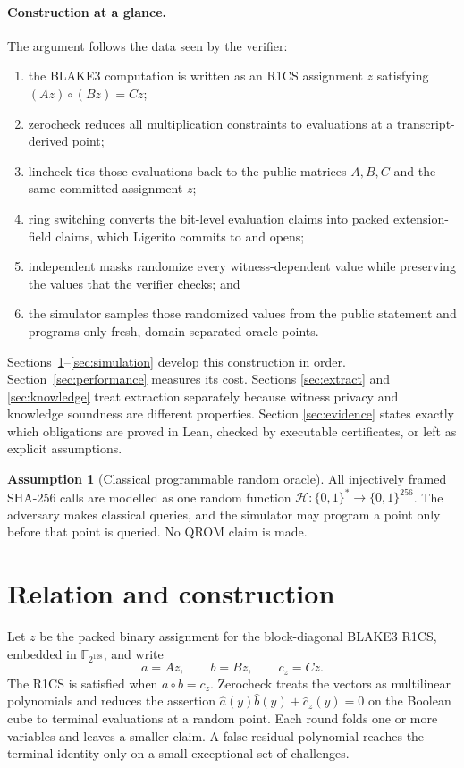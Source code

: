 \documentclass[11pt]{article}
\theoremstyle{definition}
\newtheorem{assumption}{Assumption}
\newcommand{\F}{\mathbb{F}}
\newcommand{\K}{\F_{2^{128}}}
\newcommand{\RO}{\mathcal{H}}
\begin{document}
\paragraph{Construction at a glance.}
The argument follows the data seen by the verifier:
\begin{enumerate}
\item the BLAKE3 computation is written as an R1CS assignment $z$ satisfying
      $(Az)\circ(Bz)=Cz$;
\item zerocheck reduces all multiplication constraints to evaluations at a
      transcript-derived point;
\item lincheck ties those evaluations back to the public matrices $A,B,C$ and
      the same committed assignment $z$;
\item ring switching converts the bit-level evaluation claims into packed
      extension-field claims, which Ligerito commits to and opens;
\item independent masks randomize every witness-dependent value while
      preserving the values that the verifier checks; and
\item the simulator samples those randomized values from the public statement
      and programs only fresh, domain-separated oracle points.
\end{enumerate}
Sections~\ref{sec:protocol}--\ref{sec:simulation} develop this construction in
order.  Section~\ref{sec:performance} measures its cost.  Sections
\ref{sec:extract} and \ref{sec:knowledge} treat extraction separately because
witness privacy and knowledge soundness are different properties.  Section
\ref{sec:evidence} states exactly which obligations are proved in Lean, checked
by executable certificates, or left as explicit assumptions.

\begin{assumption}[Classical programmable random oracle]\label{ass:rom}
All injectively framed SHA-256 calls are modelled as one random function
$\RO:\{0,1\}^{*}\to\{0,1\}^{256}$.  The adversary makes classical queries, and
the simulator may program a point only before that point is queried.  No QROM
claim is made.
\end{assumption}

\section{Relation and construction}\label{sec:protocol}

Let $z$ be the packed binary assignment for the block-diagonal BLAKE3 R1CS,
embedded in $\K$, and write
\[
  a=Az,\qquad b=Bz,\qquad c_z=Cz.
\]
The R1CS is satisfied when $a\circ b=c_z$.  Zerocheck treats the vectors as
multilinear polynomials and reduces the assertion
$\widehat a(y)\widehat b(y)+\widehat c_z(y)=0$ on the Boolean cube to terminal
evaluations at a random point.  Each round folds one or more variables and
leaves a smaller claim.  A false residual polynomial reaches the terminal
identity only on a small exceptional set of challenges.
\end{document}
